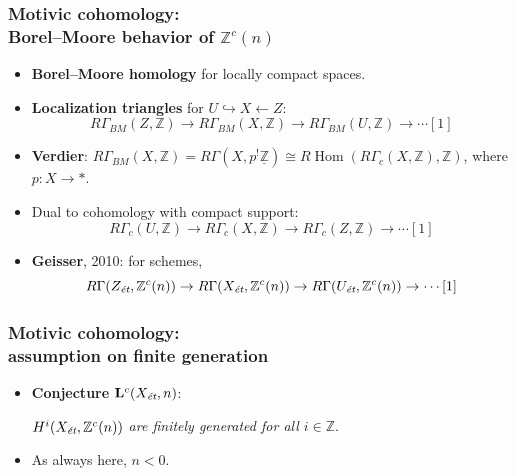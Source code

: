 \documentclass[handout]{beamer}
\newcommand{\ZZ}{\mathbb{Z}}
\newcommand{\isom}{\cong}
\DeclareMathOperator{\Hom}{Hom}
\newcommand{\RHom}{R\!\Hom}
\newcommand{\term}{\textbf}
\begin{document}

\begin{frame}
  \frametitle{Motivic cohomology:\\
    Borel--Moore behavior of $\ZZ^c (n)$}

  \begin{itemize}
  \item<2-> \term{Borel--Moore homology} for locally compact spaces.

  \item<3-> \term{Localization triangles} for $U \hookrightarrow X \leftarrow Z$:
    $$R\Gamma_{BM} (Z, \ZZ) \to
    R\Gamma_{BM} (X, \ZZ) \to
    R\Gamma_{BM} (U, \ZZ) \to \cdots [1]$$

  \item<4-> \term{Verdier}:
    $R\Gamma_{BM} (X,\ZZ) = R\Gamma (X, p^! \underline{\ZZ}) \isom
    \RHom (R\Gamma_c (X,\ZZ), \ZZ)$, where $p\colon X\to \ast$.

  \item<5-> Dual to cohomology with compact support:
    $$R\Gamma_c (U,\ZZ) \to R\Gamma_c (X,\ZZ) \to R\Gamma_c (Z,\ZZ) \to \cdots [1]$$

  \item<6-> \term{Geisser}, 2010: for schemes,
    $$R\Gamma (Z_\text{\it ét}, \ZZ^c (n)) \to
    R\Gamma (X_\text{\it ét}, \ZZ^c (n)) \to
    R\Gamma (U_\text{\it ét}, \ZZ^c (n)) \to \cdots [1]$$
  \end{itemize}
\end{frame}


\begin{frame}
  \frametitle{Motivic cohomology:\\
    assumption on finite generation}

  \begin{itemize}
  \item<2-> \term{Conjecture} $\mathbf{L}^c (X_\text{\it ét}, n)$:

    \emph{$H^i (X_\text{\it ét}, \ZZ^c (n))$
      are finitely generated for all $i\in\ZZ$}.

  \item<3->[*] As always here, $n < 0$.
  \end{itemize}
\end{frame}

\end{document}
